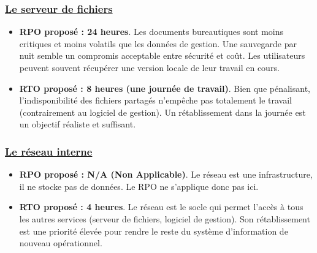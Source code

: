 \documentclass[a4paper,10pt]{article}
\newcommand{\notion}[1]{\textbf{\textcolor{mainBlue}{#1}}}
\begin{document}
\begin{tcolorbox}[title=3) RTO et RPO]
    \subsubsection*{\underline{Le serveur de fichiers}}
    \begin{itemize}[leftmargin=*]
        \item \notion{RPO proposé : 24 heures}. Les documents bureautiques sont moins critiques et moins volatils que les données de gestion. Une sauvegarde par nuit semble un compromis acceptable entre sécurité et coût. Les utilisateurs peuvent souvent récupérer une version locale de leur travail en cours.
        \item \notion{RTO proposé : 8 heures (une journée de travail)}. Bien que pénalisant, l'indisponibilité des fichiers partagés n'empêche pas totalement le travail (contrairement au logiciel de gestion). Un rétablissement dans la journée est un objectif réaliste et suffisant.
    \end{itemize}

    \subsubsection*{\underline{Le réseau interne}}
    \begin{itemize}[leftmargin=*]
        \item \notion{RPO proposé : N/A (Non Applicable)}. Le réseau est une infrastructure, il ne stocke pas de données. Le RPO ne s'applique donc pas ici.
        \item \notion{RTO proposé : 4 heures}. Le réseau est le socle qui permet l'accès à tous les autres services (serveur de fichiers, logiciel de gestion). Son rétablissement est une priorité élevée pour rendre le reste du système d'information de nouveau opérationnel.
    \end{itemize}
\end{tcolorbox}
\end{document}
